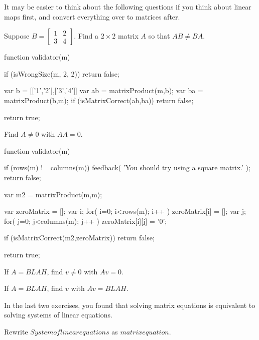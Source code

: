 \documentclass{ximera}
\begin{document}
\begin{observation}
It may be easier to think about the following questions if you think about linear maps first, and convert everything over to matrices after.
\end{observation}

\begin{question}
  Suppose $B = \begin{bmatrix} 1 & 2 \\ 3 & 4 \end{bmatrix}$.  Find a $2 \times 2$ matrix $A$ so that $AB \neq BA$.

  \begin{solution}
    \begin{matrix-answer}[name=A]
    function validator(m) {
      if (isWrongSize(m, 2, 2)) return false;
      
      var b = [['1','2'],['3','4']]
      var ab = matrixProduct(m,b);
      var ba = matrixProduct(b,m);
      if (isMatrixCorrect(ab,ba))
        return false;

      return true;
    }
    \end{matrix-answer}  
  \end{solution}
\end{question}
	
\begin{question}
  Find $A \neq 0$ with $AA = 0$.

  \begin{solution}
    \begin{matrix-answer}[name=A]
    function validator(m) {
      if (rows(m) != columns(m)) {
        feedback( 'You should try using a square matrix.' );
        return false;
      }
      
      var m2 = matrixProduct(m,m);
      
      var zeroMatrix = [];
      var i;
      for( i=0; i<rows(m); i++ ) {
        zeroMatrix[i] = [];
        var j;
        for( j=0; j<columns(m); j++ ) {
          zeroMatrix[i][j] = '0';
        }
      }

      if (isMatrixCorrect(m2,zeroMatrix))
        return false;

      return true;
    }
    \end{matrix-answer}
  \end{solution}
\end{question}
	
\begin{question}
  If $A = BLAH$, find $v \neq 0$ with $Av = 0$.
\end{question}
	
\begin{question}
  If $A = BLAH$, find $v$ with $Av = BLAH$.
\end{question}
	
In the last two exercises, you found that solving matrix equations is equivalent to solving systems of linear equations.

\begin{question}
  Rewrite  $System of linear equations$ as $matrix equation$.
\end{question}
\end{document}
